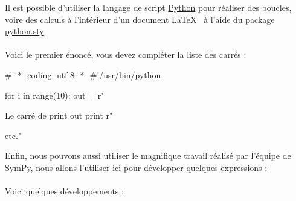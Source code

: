 \documentclass[a4]{article}
\begin{document}
Il est possible d'utiliser la langage de script \href{http://www.python.org/}{Python} pour réaliser des boucles, voire des calculs à l'intérieur d'un document \LaTeX~ à l'aide du package \href{http://www.imada.sdu.dk/~ehmsen/pythonlatex.php}{python.sty}\\

\\
Voici le premier énoncé, vous devez compléter la liste des carrés :
\begin{itemize}
\begin{python}
# -*- coding: utf-8 -*-
#!/usr/bin/python

for i in range(10):
    out = r"\item Le carr\'e de %
    print out
print r"\item etc."
\end{python}
\end{itemize}

\par
\vskip 0.5cm

Enfin, nous pouvons aussi utiliser le magnifique travail réalisé par l'équipe de \href{http://code.google.com/p/sympy/}{SymPy}, 
nous allons l'utiliser ici pour développer quelques expressions :\\

\\
Voici quelques développements :
\begin{itemize}
\end{itemize}
\par
\vskip 0.5cm
\end{document}
